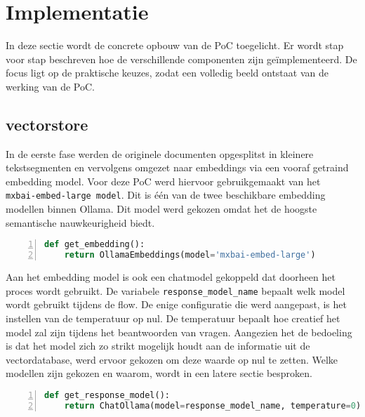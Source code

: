 \section{Implementatie}

In deze sectie wordt de concrete opbouw van de PoC toegelicht. Er wordt stap voor stap beschreven hoe de verschillende componenten zijn geïmplementeerd. De focus ligt op de praktische keuzes, zodat een volledig beeld ontstaat van de werking van de PoC.

\subsection{vectorstore}
In de eerste fase werden de originele documenten opgesplitst in kleinere tekstsegmenten en vervolgens omgezet naar embeddings via een vooraf getraind embedding model. Voor deze PoC werd hiervoor gebruikgemaakt van het \\ \verb|mxbai-embed-large model|. Dit is één van de twee beschikbare embedding modellen binnen Ollama. Dit model werd gekozen omdat het de hoogste semantische nauwkeurigheid biedt.

\begin{lstlisting}[basicstyle=\small, frame=single, breaklines=true, postbreak=\mbox{\textcolor{red}{$\hookrightarrow$}\space}, escapeinside ={\%,}, escapechar={!}, numbers=left, language=Python, caption=Ophalen van embedding model]
def get_embedding():
    return OllamaEmbeddings(model='mxbai-embed-large')
\end{lstlisting}

Aan het embedding model is ook een chatmodel gekoppeld dat doorheen het proces wordt gebruikt. De variabele \verb|response_model_name| bepaalt welk model wordt gebruikt tijdens de flow. De enige configuratie die werd aangepast, is het instellen van de temperatuur op nul. De temperatuur bepaalt hoe creatief het model zal zijn tijdens het beantwoorden van vragen. Aangezien het de bedoeling is dat het model  zich zo strikt mogelijk houdt aan de informatie uit de vectordatabase, werd ervoor gekozen om deze waarde op nul te zetten. Welke modellen zijn gekozen en waarom, wordt in een latere sectie besproken.

\begin{lstlisting}[basicstyle=\small, frame=single, breaklines=true, postbreak=\mbox{\textcolor{red}{$\hookrightarrow$}\space}, escapeinside ={\%,}, escapechar={!},
numbers=left, language=Python, caption=Initialisatie van het chat model]
def get_response_model():
    return ChatOllama(model=response_model_name, temperature=0)
\end{lstlisting}

